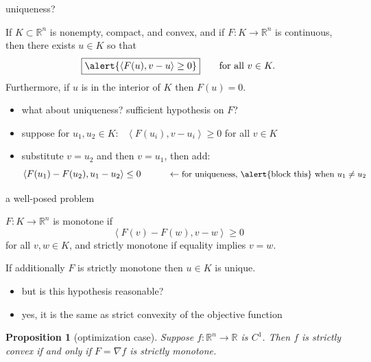 \documentclass[aspectratio=169,10pt]{beamer}
\newtheorem{proposition}[theorem]{Proposition}
\newcommand{\RR}{{\mathbb{R}}}
\newcommand{\grad}{\nabla}
\newcommand{\ip}[2]{\left\langle #1, #2 \right\rangle}
\begin{document}
\begin{frame}{uniqueness?}

\begin{theorem}
If $K\subset\mathbb{R}^n$ is nonempty, compact, and convex, and if $F:K \to\RR^n$ is continuous, then there exists $u\in K$ so that
    $$\boxed{\alert{\ip{F(u)}{v-u} \ge 0}} \qquad\text{for all } v\in K.$$
Furthermore, if $u$ is in the interior of $K$ then $F(u)=0$.
\end{theorem}

\medskip
\begin{itemize}
\item what about uniqueness? sufficient hypothesis on $F$?

\pause
\bigskip
\item suppose for $u_1,u_2\in K$: \, $\ip{F(u_i)}{v-u_i} \ge 0$ for all $v\in K$
\item substitute $v=u_2$ and then $v=u_1$, then add:
	$$\ip{F(u_1) - F(u_2)}{u_1-u_2} \le 0 \hspace{10mm} \leftarrow \text{\small for uniqueness, \alert{block this} when $u_1\ne u_2$}$$
\end{itemize}
\end{frame}


\begin{frame}{a well-posed problem}

\begin{definition}
$F:K \to \RR^n$ is \alert{monotone} if
    $$\ip{F(v)-F(w)}{v-w} \ge 0$$
for all $v,w\in K$, and \alert{strictly monotone} if equality implies $v=w$.
\end{definition}

\begin{corollary}
If additionally $F$ is strictly monotone then $u\in K$ is unique.
\end{corollary}

\begin{itemize}
\item but is this hypothesis reasonable?

\pause
\item yes, it is the same as strict convexity of the objective function
\end{itemize}

\begin{proposition}[optimization case]
Suppose $f:\RR^n \to \RR$ is $C^1$.  Then $f$ is strictly convex if and only if $F=\grad f$ is strictly monotone.
\end{proposition}
\end{frame}
\end{document}
